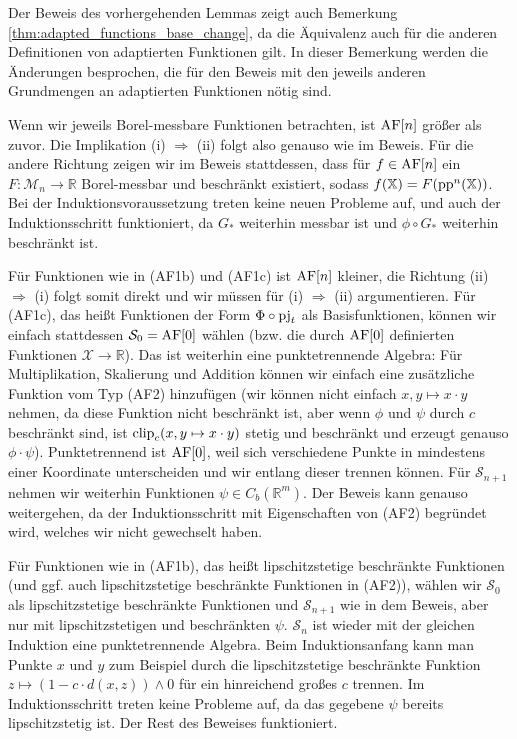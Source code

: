    \begin{remark}\label{rem:adapted_base_exchange}
        Der Beweis des vorhergehenden Lemmas zeigt auch Bemerkung \ref{thm:adapted_functions_base_change}, da die Äquivalenz auch für die anderen Definitionen von adaptierten Funktionen gilt. In dieser Bemerkung werden die Änderungen besprochen, die für den Beweis mit den jeweils anderen Grundmengen an adaptierten Funktionen nötig sind.
        
        Wenn wir jeweils Borel-messbare Funktionen betrachten, ist $\operatorname{AF}[n]$ größer als zuvor. Die Implikation (i) $\Rightarrow$ (ii) folgt also genauso wie im Beweis. Für die andere Richtung zeigen wir im Beweis stattdessen, dass für $f \in \operatorname{AF}[n]$ ein $F: \mathcal{M}_n \rightarrow \mathbb{R}$ Borel-messbar und beschränkt existiert, sodass $f(\mathbb{X})=F(\operatorname{pp}^n(\mathbb{X}))$. Bei der Induktionsvoraussetzung treten keine neuen Probleme auf, und auch der Induktionsschritt funktioniert, da $G_*$ weiterhin messbar ist und $\phi \circ G_*$ weiterhin beschränkt ist.

        Für Funktionen wie in (AF1b) und (AF1c) ist $\operatorname{AF}[n]$ kleiner, die Richtung (ii) $\Rightarrow$ (i) folgt somit direkt und wir müssen für (i) $\Rightarrow$ (ii) argumentieren. Für (AF1c), das heißt Funktionen der Form $\Phi \circ \operatorname{pj}_t$ als Basisfunktionen, können wir einfach stattdessen $\mathcal{S}_0 = \operatorname{AF}[0]$ wählen (bzw. die durch $\operatorname{AF}[0]$ definierten Funktionen $\mathcal{X} \rightarrow \mathbb{R}$). Das ist weiterhin eine punktetrennende Algebra: Für Multiplikation, Skalierung und Addition können wir einfach eine zusätzliche Funktion vom Typ (AF2) hinzufügen (wir können nicht einfach $x,y\mapsto x\cdot y$ nehmen, da diese Funktion nicht beschränkt ist, aber wenn $\phi$ und $\psi$ durch $c$ beschränkt sind, ist $\operatorname{clip}_c(x,y\mapsto x\cdot y)$ stetig und beschränkt und erzeugt genauso $\phi \cdot \psi$). 
        Punktetrennend ist $\operatorname{AF}[0]$, weil sich verschiedene Punkte in mindestens einer Koordinate unterscheiden und wir entlang dieser trennen können. Für $\mathcal{S}_{n+1}$ nehmen wir weiterhin Funktionen $\psi \in C_b(\mathbb{R}^m)$. Der Beweis kann genauso weitergehen, da der Induktionsschritt mit Eigenschaften von (AF2) begründet wird, welches wir nicht gewechselt haben.

        Für Funktionen wie in (AF1b), das heißt lipschitzstetige beschränkte Funktionen (und ggf. auch lipschitzstetige beschränkte Funktionen in (AF2)), wählen wir $\mathcal{S}_0$ als lipschitzstetige beschränkte Funktionen und $\mathcal{S}_{n+1}$ wie in dem Beweis, aber nur mit lipschitzstetigen und beschränkten $\psi$. $\mathcal{S}_n$ ist wieder mit der gleichen Induktion eine punktetrennende Algebra. Beim Induktionsanfang kann man Punkte $x$ und $y$ zum Beispiel durch die lipschitzstetige beschränkte Funktion $z \mapsto (1 - c\cdot d(x,z)) \wedge 0$ für ein hinreichend großes $c$ trennen. Im Induktionsschritt treten keine Probleme auf, da das gegebene $\psi$ bereits lipschitzstetig ist. Der Rest des Beweises funktioniert. 

    \end{remark}

